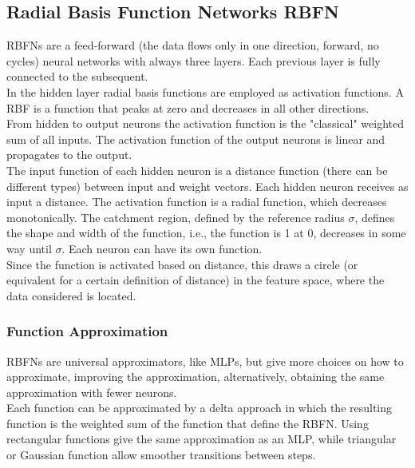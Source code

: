 \subsection{Radial Basis Function Networks RBFN}

RBFNs are a feed-forward (the data flows only in one direction, forward, no cycles) neural networks with always three layers. Each previous layer is fully connected to the subsequent.\\
In the hidden layer radial basis functions are employed as activation functions. A RBF is a function that peaks at zero and decreases in all other directions.\\

From hidden to output neurons the activation function is the "classical" weighted sum of all inputs. The activation function of the output neurons is linear and propagates to the output.\\ 

The input function of each hidden neuron is a distance function (there can be different types) between input and weight vectors. Each hidden neuron receives as input a distance. The activation function is a radial function, which decreases monotonically. The catchment region, defined by the reference radius $\sigma$, defines the shape and width of the function, i.e., the function is 1 at 0, decreases in some way until $\sigma$. Each neuron can have its own function.\\ 
Since the function is activated based on distance, this draws a circle (or equivalent for a certain definition of distance) in the feature space, where the data considered is located.\\

\subsubsection{Function Approximation}
RBFNs are universal approximators, like MLPs, but give more choices on how to approximate, improving the approximation, alternatively, obtaining the same approximation with fewer neurons.\\

Each function can be approximated by a delta approach in which the resulting function is the weighted sum of the function that define the RBFN. Using rectangular functions give the same approximation as an MLP, while triangular or Gaussian function allow smoother transitions between steps.\\

